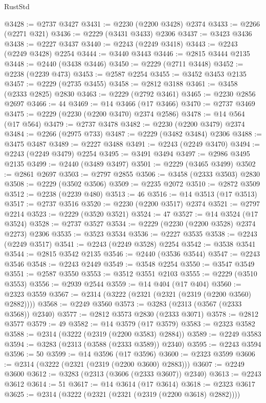 \begin{lexlean}{RustStd}
\begin{coremodule}
@3428 := @2737 @3427
@3431 := @2230 (@2200 @3428) @2374
@3433 := @2266 (@2271 @321)
@3436 := @2229 (@3431 @3433) @2306
@3437 := @3423 @3436
@3438 := @2227 @3437
@3440 := @2243 (@2249 @3418)
@3443 := @2243 (@2249 @3428) @2254
@3444 := @3440 @3443
@3446 := @2815 @3444 @2135
@3448 := @2440 (@3438 @3446)
@3450 := @2229 (@2711 @3448)
@3452 := @2238 (@2239 @473)
@3453 := @2587 @2254
@3455 := @3452 @3453 @2135
@3457 := @2229 (@2735 @3455)
@3458 := @2812 @3188
@3461 := @3458 (@2333 @2825) @2830
@3463 := @2229 (@2792 @3461)
@3465 := @2230 @2856 @2697
@3466 := 44
@3469 := @14 @3466 (@17 @3466)
@3470 := @2737 @3469
@3475 := @2229 (@2230 (@2200 @3470) @2374 @2586)
@3478 := @14 @564 (@17 @564)
@3479 := @2737 @3478
@3482 := @2230 (@2200 @3479) @2374
@3484 := @2266 (@2975 @733)
@3487 := @2229 (@3482 @3484) @2306
@3488 := @3475 @3487
@3489 := @2227 @3488
@3491 := @2243 (@2249 @3470)
@3494 := @2243 (@2249 @3479) @2254
@3495 := @3491 @3494
@3497 := @2986 @3495 @2135
@3499 := @2440 (@3489 @3497)
@3501 := @2229 (@3465 @3499)
@3502 := @2861 @2697
@3503 := @2797 @2855
@3506 := @3458 (@2333 @3503) @2830
@3508 := @2229 (@3502 @3506)
@3509 := @2235 @2072
@3510 := @2872 @3509
@3512 := @2238 (@2239 @480)
@3513 := 46
@3516 := @14 @3513 (@17 @3513)
@3517 := @2737 @3516
@3520 := @2230 (@2200 @3517) @2374
@3521 := @2797 @2214
@3523 := @2229 (@3520 @3521)
@3524 := 47
@3527 := @14 @3524 (@17 @3524)
@3528 := @2737 @3527
@3534 := @2229 (@2230 (@2200 @3528) @2374 @2273) @2306
@3535 := @3523 @3534
@3536 := @2227 @3535
@3538 := @2243 (@2249 @3517)
@3541 := @2243 (@2249 @3528) @2254
@3542 := @3538 @3541
@3544 := @2815 @3542 @2135
@3546 := @2440 (@3536 @3544)
@3547 := @2243 @3546
@3548 := @2243 @2449
@3549 := @3548 @2254
@3550 := @3547 @3549
@3551 := @2587 @3550
@3553 := @3512 @3551 @2103
@3555 := @2229 (@3510 @3553)
@3556 := @2939 @2544
@3559 := @14 @404 (@17 @404)
@3560 := @2323 @3559
@3567 := @2314 (@3222 (@2321 (@2321 (@2319 (@2200 @3560) @2882))))
@3568 := @2249 @3560
@3573 := @3283 (@2313 (@3567 (@2333 @3568)) @2340)
@3577 := @2812 @3573 @2830 (@2333 @3071)
@3578 := @2812 @3577
@3579 := 49
@3582 := @14 @3579 (@17 @3579)
@3583 := @2323 @3582
@3588 := @2314 (@3222 (@2319 (@2200 @3583) @2884))
@3589 := @2249 @3583
@3594 := @3283 (@2313 (@3588 (@2333 @3589)) @2340)
@3595 := @2243 @3594
@3596 := 50
@3599 := @14 @3596 (@17 @3596)
@3600 := @2323 @3599
@3606 := @2314 (@3222 (@2321 (@2319 (@2200 @3600) @2883)))
@3607 := @2249 @3600
@3612 := @3283 (@2313 (@3606 (@2333 @3607)) @2340)
@3613 := @2243 @3612
@3614 := 51
@3617 := @14 @3614 (@17 @3614)
@3618 := @2323 @3617
@3625 := @2314 (@3222 (@2321 (@2321 (@2319 (@2200 @3618) @2882))))

\end{coremodule}
\end{lexlean}
